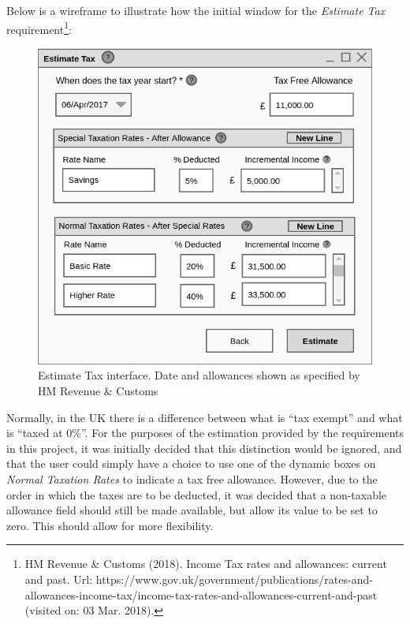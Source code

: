 Below is a wireframe to illustrate how the initial window for the
\emph{Estimate Tax} requirement\footnote{HM Revenue \& Customs (2018). Income Tax rates and allowances: current and past. Url: https://www.gov.uk/government/publications/rates-and-allowances-income-tax/income-tax-rates-and-allowances-current-and-past (visited on: 03 Mar. 2018).}:

\begin{figure}[ht!]
  \begin{center}
    \includegraphics[width=14cm]{./contents/img/Wireframe_-_Estimate_Tax.png}
  \end{center}
  \caption{Estimate Tax interface. Date and allowances shown as specified by HM
    Revenue \& Customs }
  \label{fig:Wireframe.EstimateTax}
\end{figure}
\FloatBarrier

Normally, in the UK there is a difference between what is ``tax exempt'' and
what is ``taxed at 0\%''.  For the purposes of the estimation provided by
the requirements in this project, it was initially decided that this
distinction would be ignored, and that the user could simply have a choice to
use one of the dynamic boxes on \emph{Normal Taxation Rates} to indicate a tax
free allowance. However, due to the order in which the taxes are to be
deducted, it was decided that a non-taxable allowance field should still be
made available, but allow its value to be set to zero. This should allow for
more flexibility.

